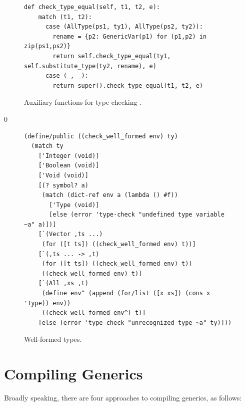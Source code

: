 \documentclass[7x10]{TimesAPriori_MIT}%
\def\racketEd{0}
\providecommand{\BookEdition}{1}
\let\edition\BookEdition
\numberwithin{theorem}{chapter}
\numberwithin{definition}{chapter}
\numberwithin{equation}{chapter}
\begin{document}
\begin{figure}[tbp]
\begin{tcolorbox}[colback=white]
{\begin{lstlisting}[basicstyle=\ttfamily\scriptsize]
def check_type_equal(self, t1, t2, e):
    match (t1, t2):
      case (AllType(ps1, ty1), AllType(ps2, ty2)):
        rename = {p2: GenericVar(p1) for (p1,p2) in zip(ps1,ps2)}
        return self.check_type_equal(ty1, self.substitute_type(ty2, rename), e)
      case (_, _):
        return super().check_type_equal(t1, t2, e)
\end{lstlisting}
\fi}
\end{tcolorbox}

\caption{Auxiliary functions for type checking \LangPoly{}.}
\label{fig:type-check-Lpoly-aux}
\end{figure}


{\if\edition\racketEd    
\begin{figure}[tbp]
\begin{tcolorbox}[colback=white]  
\begin{lstlisting}
(define/public ((check_well_formed env) ty)
  (match ty
    ['Integer (void)]
    ['Boolean (void)]
    ['Void (void)]
    [(? symbol? a)
     (match (dict-ref env a (lambda () #f))
       ['Type (void)]
       [else (error 'type-check "undefined type variable ~a" a)])]
    [`(Vector ,ts ...)
     (for ([t ts]) ((check_well_formed env) t))]
    [`(,ts ... -> ,t)
     (for ([t ts]) ((check_well_formed env) t))
     ((check_well_formed env) t)]
    [`(All ,xs ,t)
     (define env^ (append (for/list ([x xs]) (cons x 'Type)) env))
     ((check_well_formed env^) t)]
    [else (error 'type-check "unrecognized type ~a" ty)]))
\end{lstlisting}
\end{tcolorbox}

\caption{Well-formed types.}
\label{fig:well-formed-types}
\end{figure}
\fi}

\clearpage

\section{Compiling Generics}
\label{sec:compiling-poly}

Broadly speaking, there are four approaches to compiling generics, as
follows:
\end{document}

